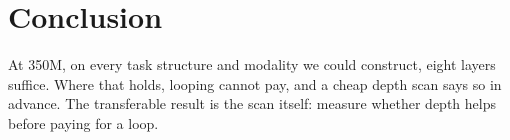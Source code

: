 \documentclass[10pt,twocolumn,letterpaper]{article}
\begin{document}
\section{Conclusion}

At 350M, on every task structure and modality we could construct, eight
layers suffice. Where that holds, looping cannot pay, and a cheap depth scan
says so in advance. The transferable result is the scan itself: measure
whether depth helps before paying for a loop.



\end{document}
